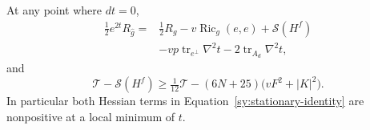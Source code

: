 \begin{lemma}
\label{sy:stationary-minimum}
At any point where $dt=0$,
\begin{equation}\label{sy:stationary-identity}
\begin{aligned}
 \tfrac12e^{2t}R_{\widehat g}
 ={}&\tfrac12R_g-v\operatorname{Ric}_g(e,e)+\mathcal S(H^f)\\
 &-vp\operatorname{tr}_{e^\perp}\nabla^2t
       -2\operatorname{tr}_{A_d}\nabla^2t,
\end{aligned}
\end{equation}
and
\begin{equation}\label{sy:stationary-subtraction}
 \mathcal T-\mathcal S(H^f)
 \ge\tfrac1{12}\mathcal T
          -(6N+25)\bigl(vF^2+|K|^2\bigr).
\end{equation}
In particular both Hessian terms in
Equation~\ref{sy:stationary-identity} are nonpositive at a local
minimum of $t$.
\end{lemma}

